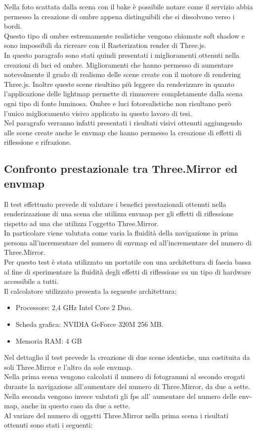 Nella foto scattata dalla scena con il bake è possibile notare come il servizio abbia permesso la creazione di ombre appena distinguibili che si dissolvono verso i bordi. 
\\
Questo tipo di ombre estremamente realistiche vengono chiamate soft shadow e sono impossibili da ricreare con il Rasterization render di Three.js. 
\\
In questo paragrafo sono stati quindi presentati i miglioramenti ottenuti nella creazioni di luci ed ombre. Miglioramenti che hanno permesso di aumentare notevolmente il grado di realismo delle scene create con il motore di rendering Three.js.
Inoltre queste scene risultino più leggere da renderizzare in quanto l’applicazione delle lightmap permette di rimuovere completamente dalla scena ogni tipo di fonte luminosa.
Ombre e luci fotorealistiche non risultano però l’unico miglioramento visivo applicato in questo lavoro di tesi.
\\
Nel paragrafo \label{sec:chapter_prove_sperimentali_qualita_visiva} verranno infatti presentati i risultati visivi ottenuti aggiungendo alle scene create anche le envmap che hanno permesso la creazione di effetti di riflessione e rifrazione.

\subsection{Confronto prestazionale tra Three.Mirror ed envmap}
Il test effettuato prevede di valutare i benefici prestazionali ottenuti nella renderizzazione di una scena che utilizza envmap per gli effetti di riflessione rispetto ad una che utilizza l’oggetto Three.Mirror.
\\
In particolare viene valutata come varia la fluidità della navigazione in prima persona all’incrementare del numero di envmap ed all’incrementare del numero di Three.Mirror.
\\
Per questo test è stata utilizzato un portatile con una architettura di fascia bassa al fine di sperimentare la fluidità degli effetti di riflessione su un tipo di hardware accessibile a tutti.
\\
Il calcolatore utilizzato presenta la seguente architettura:
\begin{itemize}
\item Processore: 2,4 GHz Intel Core 2 Duo.
\item Scheda grafica: NVIDIA GeForce 320M 256 MB.
\item Memoria RAM: 4 GB
\end{itemize}
Nel dettaglio il test prevede la creazione di due scene identiche, una costituita da soli Three.Mirror e l’altro da sole envmap.
\\
Nella prima scena vengono calcolati il numero di fotogrammi al secondo erogati durante la navigazione all’aumentare del numero di Three.Mirror, da due a sette.
\\
Nella seconda vengono invece valutati gli fps all’ aumentare del numero delle env-map, anche in questo caso da due a sette.
\\
Al variare del numero di oggetti Three.Mirror nella prima scena i risultati ottenuti sono stati i seguenti:





